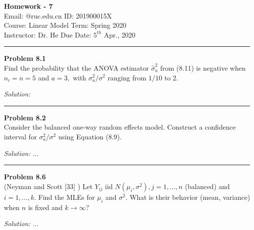 \documentclass[a4paper, 11pt]{article}
\newenvironment{problem}[2][Problem]
    { \begin{mdframed}[backgroundcolor=gray!20] \textbf{#1 #2} \\}
    {  \end{mdframed}}
\newenvironment{solution}
    {\textit{Solution:}}
    {}
\begin{document}
\noindent
\large\textbf{} \hfill \textbf{Homework - 7}   \\
Email: @ruc.edu.cn \hfill ID: 201900015X\\
\normalsize Course: Linear Model \hfill Term: Spring 2020\\
Instructor: Dr. He  \hfill Due Date: $5^{th}$ Apr., 2020 \\
\noindent\rule{7in}{2.8pt}
\begin{problem}{8.1}
Find the probability that the ANOVA estimator $\hat{\sigma}_{a}^{2}$ from (8.11) is negative when $n_{i}=n=5$ and $a=3,$ with $\sigma_{a}^{2} / \sigma^{2}$ ranging from $1 / 10$ to 2.

\end{problem}
\begin{solution}
	
\end{solution} 
\noindent\rule{7in}{2.8pt}


\begin{problem}{8.2}
Consider the balanced one-way random effects model. Construct a confidence interval for $\sigma_{a}^{2} / \sigma^{2}$ using Equation (8.9).	
\end{problem}
\begin{solution}
	...
\end{solution} 

\noindent\rule{7in}{2.8pt}

\begin{problem}{8.6}
(Neyman and Scott [33] ) Let $Y_{i j}$ iid $N\left(\mu_{i}, \sigma^{2}\right), j=1, \ldots, n$ (balanced) and $i=1, \ldots, k .$ Find the MLEs for $\mu_{i}$ and $\sigma^{2} .$ What is their behavior (mean, variance) when $n$ is fixed and $k \rightarrow \infty ?$
\end{problem}
\begin{solution}
	...
\end{solution} 
\end{document}

